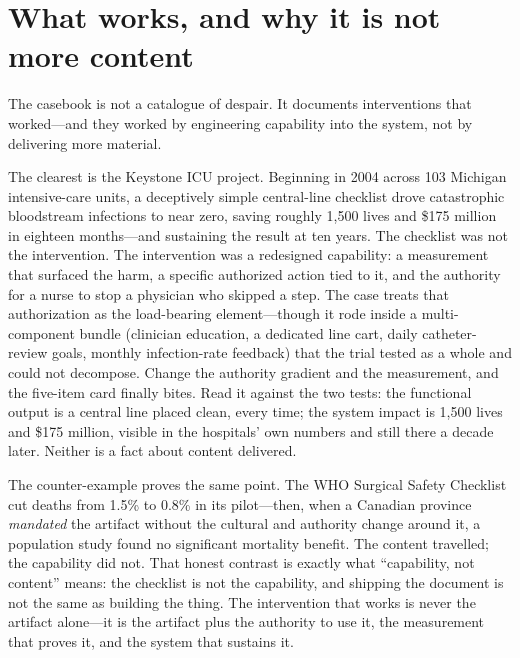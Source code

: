 \documentclass[11pt]{article}
\begin{document}
\section{What works, and why it is not more content}

The casebook is not a catalogue of despair. It documents interventions that worked---and they worked by engineering capability into the system, not by delivering more material.

The clearest is the Keystone ICU project. Beginning in 2004 across 103 Michigan intensive-care units, a deceptively simple central-line checklist drove catastrophic bloodstream infections to near zero, saving roughly 1{,}500 lives and \$175 million in eighteen months---and sustaining the result at ten years. The checklist was not the intervention. The intervention was a redesigned capability: a measurement that surfaced the harm, a specific authorized action tied to it, and the authority for a nurse to stop a physician who skipped a step. The case treats that authorization as the load-bearing element---though it rode inside a multi-component bundle (clinician education, a dedicated line cart, daily catheter-review goals, monthly infection-rate feedback) that the trial tested as a whole and could not decompose. Change the authority gradient and the measurement, and the five-item card finally bites. Read it against the two tests: the functional output is a central line placed clean, every time; the system impact is 1{,}500 lives and \$175 million, visible in the hospitals' own numbers and still there a decade later. Neither is a fact about content delivered.

The counter-example proves the same point. The WHO Surgical Safety Checklist cut deaths from 1.5\% to 0.8\% in its pilot---then, when a Canadian province \emph{mandated} the artifact without the cultural and authority change around it, a population study found no significant mortality benefit. The content travelled; the capability did not. That honest contrast is exactly what ``capability, not content'' means: the checklist is not the capability, and shipping the document is not the same as building the thing. The intervention that works is never the artifact alone---it is the artifact plus the authority to use it, the measurement that proves it, and the system that sustains it.

\end{document}
